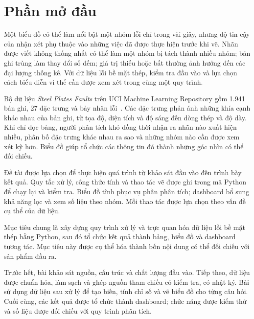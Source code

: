 \chapter*{Phần mở đầu}
\label{chap:modau}


Một biểu đồ có thể làm nổi bật một nhóm lỗi chỉ trong vài giây, nhưng độ tin cậy của nhận xét phụ thuộc vào những việc đã được thực hiện trước khi vẽ. Nhãn được viết không thống nhất có thể làm một nhóm bị tách thành nhiều nhóm; bản ghi trùng làm thay đổi số đếm; giá trị thiếu hoặc bất thường ảnh hưởng đến các đại lượng thống kê. Với dữ liệu lỗi bề mặt thép, kiểm tra đầu vào và lựa chọn cách biểu diễn vì thế cần được xem xét trong cùng một quy trình.

Bộ dữ liệu \textit{Steel Plates Faults} trên UCI Machine Learning Repository gồm 1.941 bản ghi, 27 đặc trưng và bảy nhãn lỗi~\cite{uci}. Các đặc trưng phản ánh những khía cạnh khác nhau của bản ghi, từ tọa độ, diện tích và độ sáng đến dòng thép và độ dày. Khi chỉ đọc bảng, người phân tích khó đồng thời nhận ra nhãn nào xuất hiện nhiều, phân bố đặc trưng khác nhau ra sao và những nhóm nào cần được xem xét kỹ hơn. Biểu đồ giúp tổ chức các thông tin đó thành những góc nhìn có thể đối chiếu.

Đề tài \textit{\tenDeTai} được lựa chọn để thực hiện quá trình từ khảo sát đầu vào đến trình bày kết quả. Quy tắc xử lý, công thức tính và thao tác vẽ được ghi trong mã Python để chạy lại và kiểm tra. Biểu đồ tĩnh phục vụ phần phân tích; dashboard bổ sung khả năng lọc và xem số liệu theo nhóm. Mỗi thao tác được lựa chọn theo vấn đề cụ thể của dữ liệu.


Mục tiêu chung là xây dựng quy trình xử lý và trực quan hóa dữ liệu lỗi bề mặt thép bằng Python, sau đó tổ chức kết quả thành bảng, biểu đồ và dashboard tương tác. Mục tiêu này được cụ thể hóa thành bốn nội dung có thể đối chiếu với sản phẩm đầu ra.

Trước hết, bài khảo sát nguồn, cấu trúc và chất lượng đầu vào. Tiếp theo, dữ liệu được chuẩn hóa, làm sạch và ghép nguồn tham chiếu có kiểm tra, có nhật ký. Bài sử dụng dữ liệu sau xử lý để tạo biến, tính chỉ số và vẽ biểu đồ cho từng câu hỏi. Cuối cùng, các kết quả được tổ chức thành dashboard; chức năng được kiểm thử và số liệu được đối chiếu với quy trình phân tích.

